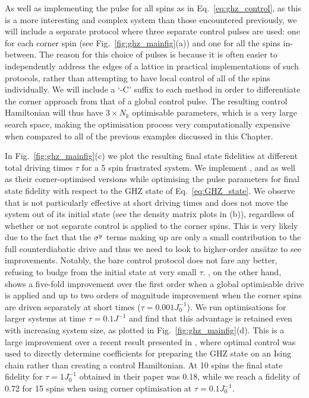 As well as implementing the  pulse for all spins as in Eq.~\ref{eq:ghz_control}, as this is a more interesting and complex system than those encountered previously, we will include a separate protocol where three separate control pulses are used: one for each corner spin (see Fig.~\ref{fig:ghz_mainfig}(a)) and one for all the spins in-between. The reason for this choice of pulses is because it is often easier to independently address the edges of a lattice in practical implementations of such protocols, rather than attempting to have local control of all of the spins individually. We will include a `-C' suffix to each method in order to differentiate the corner approach from that of a global control pulse. The resulting control Hamiltonian will thus have $3 \times N_k$ optimisable parameters, which is a very large search space, making the optimisation process very computationally expensive when compared to all of the previous examples discussed in this Chapter. 

In Fig.~\ref{fig:ghz_mainfig}(c) we plot the resulting final state fidelities at different total driving times $\tau$ for a 5 spin frustrated system. We implement ,  and   as well as their corner-optimised versions while optimising the pulse parameters for final state fidelity with respect to the GHZ state of Eq.~\eqref{eq:GHZ_state}. We observe that   is not particularly effective at short driving times and does not move the system out of its initial state (see the density matrix plots in (b)), regardless of whether or not separate control is applied to the corner spins. This is very likely due to the fact that the $\sigma^y$ terms making up   are only a small contribution to the full counterdiabatic drive and thus we need to look to higher-order ans\"{a}tze to see improvements. Notably, the bare control protocol  does not fare any better, refusing to budge from the initial state at very small $\tau$.  , on the other hand, shows a five-fold improvement over the first order when a global optimisable drive is applied and up to two orders of magnitude improvement when the corner spins are driven separately at short times ($\tau = 0.001J_0^{-1}$).  We run optimisations for larger systems at time $\tau = 0.1J^{-1}$ and find that this advantage is retained even with increasing system size, as plotted in Fig.~\ref{fig:ghz_mainfig}(d). This is a large improvement over a recent result presented in \cite{sun_optimizing_2022}, where optimal control was used to directly determine   coefficients for preparing the GHZ state on an Ising chain rather than creating a control Hamiltonian. At 10 spins the final state fidelity for $\tau = 1J_0^{-1}$ obtained in their paper was 0.18, while we reach a fidelity of 0.72 for 15 spins when using corner optimisation at $\tau = 0.1J_0^{-1}$. 

